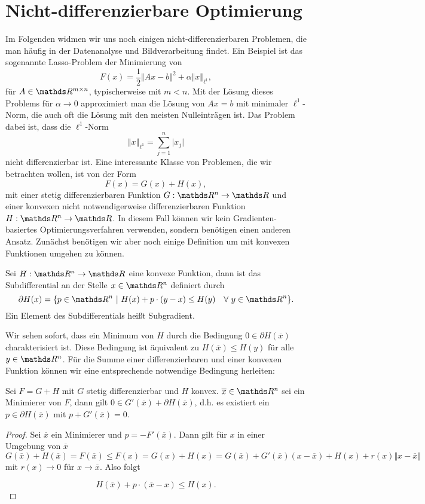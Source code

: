 \section{Nicht-differenzierbare Optimierung}

Im Folgenden widmen wir uns noch einigen nicht-differenzierbaren Problemen, die man h\"aufig in der Datenanalyse und Bildverarbeitung findet. Ein Beispiel ist das sogenannte Lasso-Problem der Minimierung von 
$$ F(x) = \frac{1}2 \Vert A x - b \Vert^2 + \alpha \Vert x \Vert_{\ell^1}, $$
f\"ur $A \in \R^{m \times n}$, typischerweise mit $m < n$. Mit der L\"osung dieses Problems f\"ur $\alpha \rightarrow 0$ approximiert man die L\"osung von $Ax=b$ mit minimaler $\ell^1$-Norm, die auch oft die L\"osung mit den meisten Nulleintr\"agen ist. Das Problem dabei ist, dass die $\ell^1$-Norm 
$$ \Vert  x \Vert_{\ell^1} = \sum_{j=1}^n \vert x_j \vert $$
nicht differenzierbar ist. Eine interessante Klasse von Problemen, die wir betrachten wollen, ist von der Form
$$ F(x) = G(x) + H(x), $$
mit einer stetig differenzierbaren Funktion  $G:\R^n \rightarrow \R$ und einer konvexen nicht notwendigerweise differenzierbaren Funktion $H: \R^n \rightarrow \R$. In diesem Fall k\"onnen wir kein Gradienten-basiertes Optimierungsverfahren verwenden, sondern ben\"otigen einen anderen Ansatz. Zun\"achst ben\"otigen wir aber noch einige Definition um mit konvexen Funktionen umgehen zu k\"onnen.

\begin{definition}{}{}
Sei $H: \R^n \rightarrow \R$ eine konvexe Funktion, dann ist das Subdifferential an der Stelle $x \in \R^n$ definiert durch
$$ \partial H(x) =  \{ p \in \R^n ~|~ H(x) + p \cdot (y-x) \leq H(y) \quad \forall~y \in \R^n \}. $$
Ein Element des Subdifferentials heißt Subgradient.
\end{definition}

Wir sehen sofort, dass ein Minimum von $H$ durch die Bedingung $0 \in \partial H(\overline{x})$ charakterisiert ist. Diese Bedingung ist \"aquivalent zu $H(\overline{x}) \leq H(y)$ f\"ur alle $y \in \R^n$. F\"ur die Summe einer differenzierbaren und einer konvexen Funktion k\"onnen wir eine entsprechende notwendige Bedingung herleiten:

\begin{lemma}{}{}
Sei $F=G+H$ mit $G$ stetig differenzierbar und $H$ konvex. $\overline{x} \in \R^n$ sei ein Minimierer von $F$, dann gilt $0 \in G'(\overline{x}) + \partial H(\overline{x})$, d.h. es existiert ein $p \in \partial H(\overline{x})$ mit $p+G'(\overline{x}) = 0$. 
\end{lemma} 
\begin{proof}
Sei $\overline{x}$ ein Minimierer und $p= -F'(\overline{x})$. Dann gilt f\"ur $x$ in einer Umgebung von $\overline{x}$
$$ G(\overline{x})  + H(\overline{x}) = F(\overline{x}) \leq F(x) = G(x) + H(x) = G(\overline{x}) + G'(\overline{x})(x-\overline{x})+ H(x) + r(x)\Vert x-\overline{x} \Vert $$
mit $r(x) \rightarrow 0$ f\"ur $x \rightarrow \overline{x}$. 
Also folgt 

$$  H(\overline{x}) + p \cdot (\overline{x} - x) \leq H(x).$$
\end{proof}

